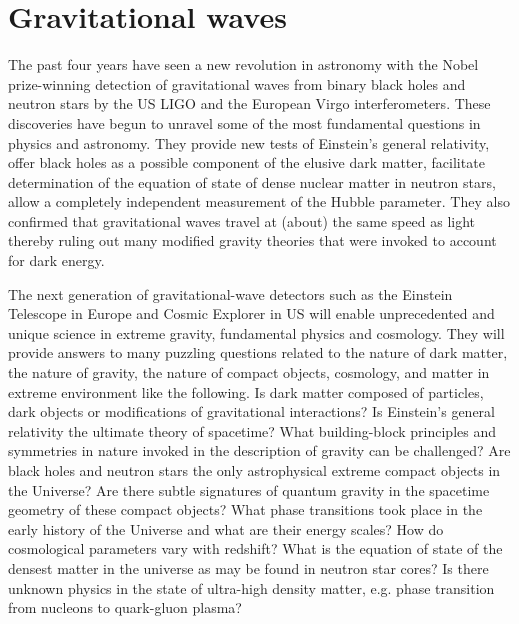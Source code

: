 \section{Gravitational waves}
The past four years have seen a new revolution in astronomy with the Nobel prize-winning detection of gravitational waves from binary black holes and neutron stars by the US LIGO and the European Virgo interferometers. These discoveries have begun to unravel some of the most fundamental questions in physics and astronomy. They provide new tests of Einstein's general relativity, offer black holes as a possible component of the elusive dark matter,  facilitate determination of the equation of state of dense nuclear matter in neutron stars, allow a completely independent measurement of the Hubble parameter. They also confirmed that gravitational waves travel at (about) the same speed as light thereby ruling out many modified gravity theories that were invoked to account for dark energy.  

The next generation of gravitational-wave detectors such as the Einstein Telescope in Europe and Cosmic Explorer in US will enable unprecedented and unique science in extreme gravity, fundamental physics and cosmology. They will provide answers to many puzzling questions related to the nature of dark matter, the nature of gravity, the nature of compact objects, cosmology, and matter in extreme environment like the following.
Is dark matter composed of particles, dark objects or modifications of gravitational interactions?
Is Einstein's general relativity the ultimate theory of spacetime?  What building-block principles and symmetries in nature invoked in the description of gravity can be challenged?
Are black holes and neutron stars the only astrophysical extreme compact objects in the Universe? Are there subtle signatures of quantum gravity in the spacetime geometry of these compact objects?
What phase transitions took place in the early history of the Universe and what are their energy scales? How do cosmological parameters vary with redshift?
What is the equation of state of the densest matter in the universe as may be found in neutron star cores? Is there unknown physics in the state of ultra-high density matter, e.g. phase transition from nucleons to quark-gluon plasma?


